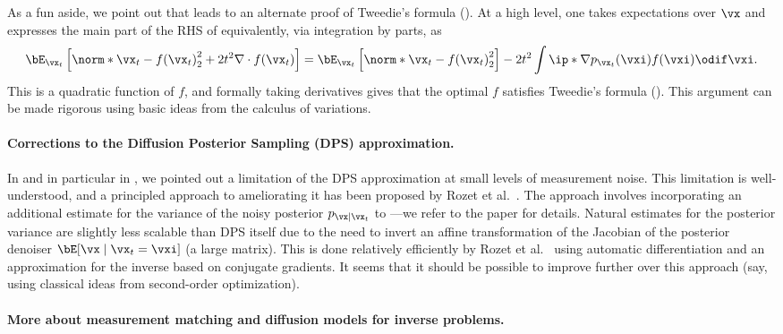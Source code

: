 \documentclass[../../book-main_zh.tex]{subfiles}
\begin{document}
As a fun aside, we point out that  leads to an alternate
proof of Tweedie's formula (). At a high level, one takes
expectations over $\vx$ and expresses the main part of the RHS of
 equivalently, via integration by parts, as
\begin{equation}
    \bE_{\vx_t}\left[
        \norm*{\vx_t - f(\vx_t)}_2^2
        + 2t^2 \nabla \cdot f(\vx_t)
    \right]
    =
    \bE_{\vx_t}\left[
        \norm*{\vx_t - f(\vx_t)}_2^2
    \right]
    - 2t^2 \int
    \ip*{\nabla p_{\vx_t}(\vxi)}{f(\vxi)}
    \odif \vxi.
\end{equation}
This is a quadratic function of $f$, and formally taking derivatives gives
that the optimal $f$ satisfies Tweedie's formula (). This
argument can be made rigorous using basic ideas from the calculus of variations.

\paragraph{Corrections to the Diffusion Posterior Sampling (DPS) approximation.}
In  and in particular in
, we pointed out
a limitation of the DPS approximation
 at
small levels of measurement noise.
This limitation is well-understood, and a principled approach to ameliorating it
has been proposed by Rozet et al.\ \cite{rozet2024learning}.
The approach involves incorporating an additional estimate for the variance of
the noisy posterior $p_{\vx \mid \vx_t}$ to
---we
refer to the paper for details.
Natural estimates for the posterior variance are slightly less scalable than DPS
itself due to the need to invert an affine transformation of the Jacobian of
the posterior denoiser $\bE[\vx \mid \vx_t=\vxi]$ (a large matrix). This is done
relatively efficiently by Rozet et al.\ \cite{rozet2024learning}
using automatic differentiation and an
approximation for the inverse based on conjugate gradients. It seems that it
should be possible to improve further over this approach (say, using classical
ideas from second-order optimization).

\paragraph{More about measurement matching and diffusion models for inverse
problems.}
\end{document}
